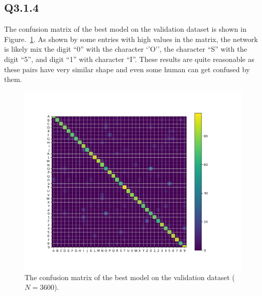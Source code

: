 \documentclass[11pt]{article}
\begin{document}
\newpage

\subsection*{Q3.1.4}

The confusion matrix of the best model on the validation dataset is shown in Figure.~\ref{fig:q3.1.4}. As shown by some entries with high values in the matrix, the network is likely mix the digit ``0'' with the character `'O'', the character ``S'' with the digit ``5'', and digit ``1'' with character ``I''. These results are quite reasonable as these pairs have very similar shape and even some human can get confused by them.

\begin{figure}[h!]
    \centering
    \includegraphics[width=.8\linewidth]{../results/q3_1_4.png}
    \caption{The confusion matrix of the best model on the validation dataset ($N=3600$). }
    \label{fig:q3.1.4}
\end{figure}
\end{document}
